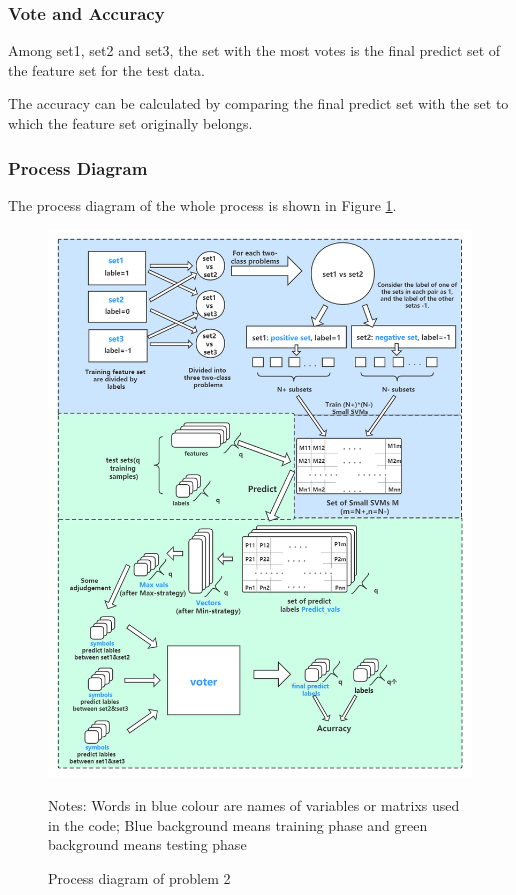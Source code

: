 \subsubsection{Vote and Accuracy}
Among set1, set2 and set3, the set with the most votes is the final predict set of the feature set for the test data.


The accuracy can be calculated by comparing the final predict set with the set to which the feature set originally belongs.
\subsubsection{Process Diagram}
The process diagram of the whole process is shown in Figure \ref{fig:Process diagram of problem 2}.
\begin{figure}[h!]
    \centering
    \includegraphics[width=\textwidth]{figures/Process diagram of problem 2.png}
    \caption{Process diagram of problem 2}
    \label{fig:Process diagram of problem 2}
    Notes: Words in blue colour are names of variables or matrixs used in the code;
Blue background means training phase and green background means testing phase
\end{figure}



